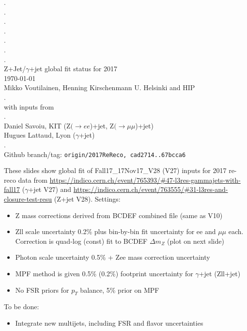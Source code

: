\documentclass[landscape,10pt]{beamer} %
\begin{document}
\begin{centering}
{. }\\
{. }\\
{. }\\
{. }\\
{. }\\
{. }\\
{. }\\
Z+Jet/$\gamma$+jet global fit status for 2017\\
\today\\
Mikko Voutilainen, Henning Kirschenmann
U. Helsinki and HIP\\
.\\
with inputs from\\
.\\
Daniel Savoiu, KIT (Z$(\rightarrow ee$)+jet, Z$(\rightarrow \mu\mu$)+jet)\\
Hugues Lattaud, Lyon ($\gamma$+jet)\\
.\\
Github branch/tag: \verb|origin/2017ReReco, cad2714..67bcca6|\\
\end{centering}
\newpage

These slides show global fit of Fall17\_17Nov17\_V28 (V27) inputs for 2017 re-reco data from {\tiny \url{https://indico.cern.ch/event/765393/#47-l3res-gammajets-with-fall17}} ($\gamma$+jet V27) and {\tiny \url{https://indico.cern.ch/event/763555/#31-l3res-and-closure-test-resu}} (Z+jet V28). Settings:
\begin{itemize}
\item Z mass corrections derived from BCDEF combined file (same as V10)
\item Zll scale uncertainty 0.2\% plus bin-by-bin fit uncertainty for ee and $\mu\mu$ each. Correction is quad-log (const) fit to BCDEF $\Delta m_Z$ (plot on next slide)
\item Photon scale uncertainty 0.5\% + Zee mass correction uncertainty
\item MPF method is given 0.5\% (0.2\%) footprint uncertainty for $\gamma$+jet (Zll+jet)
\item No FSR priors for $p_T$ balance, 5\% prior on MPF
\end{itemize}

To be done:
\begin{itemize}
\item Integrate new multijets, including FSR and flavor uncertainties
\end{itemize}
\end{document}
